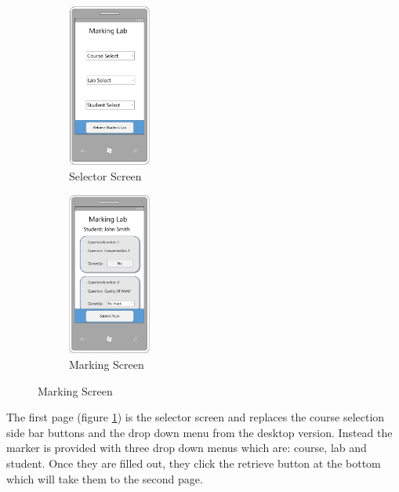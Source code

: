 \documentclass[12pt]{article}  %
\begin{document}
\begin{figure}[H]
\caption{Marking Page: Mobile Designs}
\label{fig:marking-mobile}
\centering
\begin{subfigure}[c]{0.45\textwidth}
    \centering
    \includegraphics[width=0.3\textwidth]{images/design/marking-select-mobile.png}
    \caption{Selector Screen}
    \label{fig:design-marking-select-mb}
\end{subfigure}
\hfill
\begin{subfigure}[c]{0.45\textwidth}
    \centering
    \includegraphics[width=0.3\textwidth]{images/design/marking-mobile.png}
    \caption{Marking Screen}
    \label{fig:design-marking-mb}
\end{subfigure}
\end{figure}


\noindent The first page (figure \ref{fig:design-marking-select-mb}) is the selector screen and replaces the course selection side bar buttons and the drop down menu from the desktop version. Instead the marker is provided with three drop down menus which are: course, lab and student. Once they are filled out, they click the retrieve button at the bottom which will take them to the second page.
\end{document}
